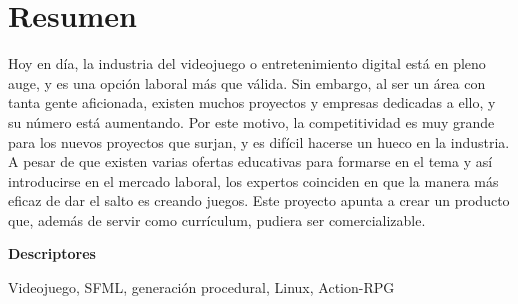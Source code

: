 \chapter*{Resumen}

Hoy en día, la industria del videojuego o entretenimiento digital está en pleno auge, y es una opción laboral más que válida. Sin embargo, al ser un área con tanta gente aficionada, existen muchos proyectos y empresas dedicadas a ello, y su número está aumentando. Por este motivo, la competitividad es muy grande para los nuevos proyectos que surjan, y es difícil hacerse un hueco en la industria. A pesar de que existen varias ofertas educativas para formarse en el tema y así introducirse en el mercado laboral, los expertos coinciden en que la manera más eficaz de dar el salto es creando juegos. Este proyecto apunta a crear un producto que, además de servir como currículum, pudiera ser comercializable.

\vspace{2em}

{\Large\bfseries\sffamily Descriptores}
\vspace{3\medskipamount}

Videojuego, SFML, generación procedural, Linux, Action-RPG